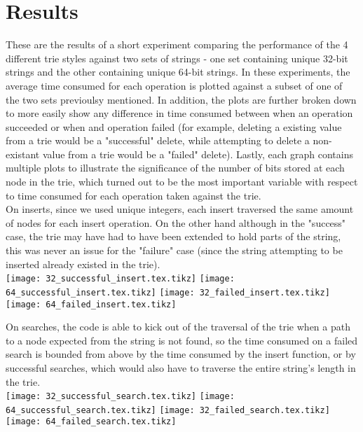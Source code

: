 \documentclass{llncs}
\begin{document}
\section{Results}
These are the results of a short experiment comparing the performance of the 4 different trie styles against two sets of strings - one set containing unique 32-bit strings and the other containing unique 64-bit strings. In these experiments, the average time consumed for each operation is plotted against a subset of one of the two sets previoulsy mentioned. In addition, the plots are further broken down to more easily show any difference in time consumed between when an operation succeeded or when and operation failed (for example, deleting a existing value from a trie would be a "successful" delete, while attempting to delete a non-existant value from a trie would be a "failed" delete). Lastly, each graph contains multiple plots to illustrate the significance of the number of bits stored at each node in the trie, which turned out to be the most important variable with respect to time consumed for each operation taken against the trie. \\
\newpage
On inserts, since we used unique integers, each insert traversed the same amount of nodes for each insert operation. On the other hand although in the "success" case, the trie may have had to have been extended to hold parts of the string, this was never an issue for the "failure" case (since the string attempting to be inserted already existed in the trie).\\
\texttt{[image: 32\_successful\_insert.tex.tikz]}
\texttt{[image: 64\_successful\_insert.tex.tikz]}
\texttt{[image: 32\_failed\_insert.tex.tikz]}
\texttt{[image: 64\_failed\_insert.tex.tikz]}

\newpage
On searches, the code is able to kick out of the traversal of the trie when a path to a node expected from the string is not found, so the time consumed on a failed search is bounded from above by the time consumed by the insert function, or by successful searches, which would also have to traverse the entire string's length in the trie. \\
\texttt{[image: 32\_successful\_search.tex.tikz]}
\texttt{[image: 64\_successful\_search.tex.tikz]}
\texttt{[image: 32\_failed\_search.tex.tikz]}
\texttt{[image: 64\_failed\_search.tex.tikz]}
\end{document}
